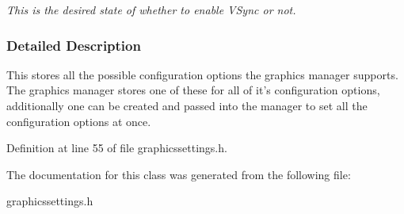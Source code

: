 \begin{DoxyCompactItemize}
\begin{DoxyCompactList}\small\item\em This is the desired state of whether to enable VSync or not. \item\end{DoxyCompactList}\end{DoxyCompactItemize}


\subsubsection{Detailed Description}
This stores all the possible configuration options the graphics manager supports. The graphics manager stores one of these for all of it's configuration options, additionally one can be created and passed into the manager to set all the configuration options at once. 

Definition at line 55 of file graphicssettings.h.



The documentation for this class was generated from the following file:\begin{DoxyCompactItemize}
\item 
graphicssettings.h\end{DoxyCompactItemize}
